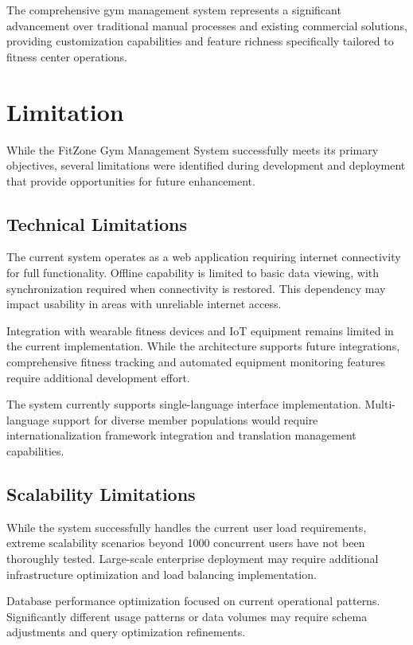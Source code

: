 \documentclass[12pt,a4paper]{report}
\begin{document}
The comprehensive gym management system represents a significant advancement over traditional manual processes and existing commercial solutions, providing customization capabilities and feature richness specifically tailored to fitness center operations.

\section{Limitation}
\label{sec:limitations}

While the FitZone Gym Management System successfully meets its primary objectives, several limitations were identified during development and deployment that provide opportunities for future enhancement.

\subsection{Technical Limitations}

The current system operates as a web application requiring internet connectivity for full functionality. Offline capability is limited to basic data viewing, with synchronization required when connectivity is restored. This dependency may impact usability in areas with unreliable internet access.

Integration with wearable fitness devices and IoT equipment remains limited in the current implementation. While the architecture supports future integrations, comprehensive fitness tracking and automated equipment monitoring features require additional development effort.

The system currently supports single-language interface implementation. Multi-language support for diverse member populations would require internationalization framework integration and translation management capabilities.

\subsection{Scalability Limitations}

While the system successfully handles the current user load requirements, extreme scalability scenarios beyond 1000 concurrent users have not been thoroughly tested. Large-scale enterprise deployment may require additional infrastructure optimization and load balancing implementation.

Database performance optimization focused on current operational patterns. Significantly different usage patterns or data volumes may require schema adjustments and query optimization refinements.
\end{document}
